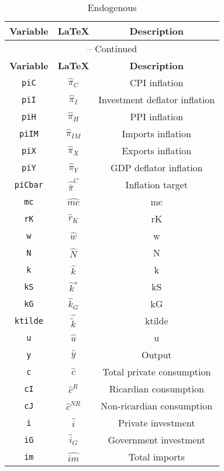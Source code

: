 \begin{center}
\begin{longtable}{ccc}
\caption{Endogenous}\\%
\hline%
\multicolumn{1}{c}{\textbf{Variable}} &
\multicolumn{1}{c}{\textbf{\LaTeX}} &
\multicolumn{1}{c}{\textbf{Description}}\\%
\hline\hline%
\endfirsthead
\multicolumn{3}{c}{{\tablename} \thetable{} -- Continued}\\%
\hline%
\multicolumn{1}{c}{\textbf{Variable}} &
\multicolumn{1}{c}{\textbf{\LaTeX}} &
\multicolumn{1}{c}{\textbf{Description}}\\%
\hline\hline%
\endhead
\texttt{piC} & $\hat{\pi}_{C}$ & CPI inflation\\
\texttt{piI} & $\hat{\pi}_{I}$ & Investment deflator inflation\\
\texttt{piH} & $\hat{\pi}_{H}$ & PPI inflation\\
\texttt{piIM} & $\hat{\pi}_{IM}$ & Imports inflation\\
\texttt{piX} & $\hat{\pi}_{X}$ & Exports inflation\\
\texttt{piY} & $\hat{\pi}_{Y}$ & GDP deflator inflation\\
\texttt{piCbar} & $\hat{\bar{\pi}}^C$ & Inflation target\\
\texttt{mc} & $\hat{mc}$ & mc\\
\texttt{rK} & $\hat{r}_K$ & rK\\
\texttt{w} & $\hat{w}$ & w\\
\texttt{N} & $\hat{N}$ & N\\
\texttt{k} & $\hat{k}$ & k\\
\texttt{kS} & $\hat{k}^s$ & kS\\
\texttt{kG} & $\hat{k}_G$ & kG\\
\texttt{ktilde} & $\hat{\tilde{k}}$ & ktilde\\
\texttt{u} & $\hat{u}$ & u\\
\texttt{y} & $\hat{y}$ & Output\\
\texttt{c} & $\hat{c}$ & Total private consumption\\
\texttt{cI} & $\hat{c}^R$ & Ricardian consumption\\
\texttt{cJ} & $\hat{c}^{NR}$ & Non-ricardian consumption\\
\texttt{i} & $\hat{i}$ & Private investment\\
\texttt{iG} & $\hat{i}_G$ & Government investment\\
\texttt{im} & $\hat{im}$ & Total imports\\

\end{longtable}
\end{center}
